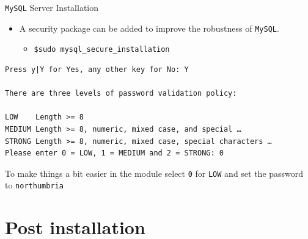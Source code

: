 \documentclass[xcolor=table,aspectratio=169]{beamer}
\begin{document}
\begin{frame}[fragile]{\texttt{MySQL} Server Installation}
  \begin{itemize}
    \item A security package can be added to improve the robustness of \texttt{MySQL}.
    \begin{itemize}
      \item \texttt{\$sudo mysql\_secure\_installation}
    \end{itemize}
  \end{itemize}
  \begin{tcolorbox}
    \lstset{
      basicstyle=\tiny\ttfamily,
    }
    \begin{lstlisting}
Press y|Y for Yes, any other key for No: Y

There are three levels of password validation policy:
      
LOW    Length >= 8
MEDIUM Length >= 8, numeric, mixed case, and special …
STRONG Length >= 8, numeric, mixed case, special characters …
Please enter 0 = LOW, 1 = MEDIUM and 2 = STRONG: 0
    \end{lstlisting}
  \end{tcolorbox}
  \begin{tcolorbox}
    To make things a bit easier in the module select \texttt{0} for \texttt{LOW} and set the password to \texttt{northumbria}
  \end{tcolorbox}
\end{frame}

\section{Post installation}
\end{document}
